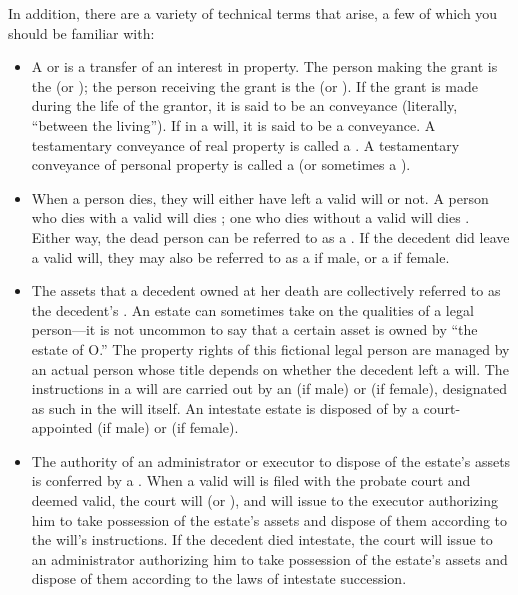 In addition, there are a variety of technical terms that arise, a few of which
you should be familiar with:
\begin{itemize}
\item A  or  is a transfer of an interest in
property. The person making the grant is the  (or
); the person receiving the grant is the  (or
). If the grant is made during the life of the grantor,
it is said to be an  conveyance (literally, ``between the
living''). If in a will, it is said to be a  conveyance. A
testamentary conveyance of real property is called a . A
testamentary conveyance of personal property is called a  (or
sometimes a ).

\item When a person dies, they will either have left a valid will or not. A
person who dies with a valid will dies ; one who dies without a
valid will dies . Either way, the dead person can be
referred to as a . If the decedent did leave a valid will,
they may also be referred to as a  if male, or a
 if female. 

\item The assets that a decedent owned at her death are collectively referred to
as the decedent's . An estate can sometimes take on the
qualities of a legal person---it is not uncommon to say that a certain asset is
owned by ``the estate of O.'' The property rights of this fictional legal
person are managed by an actual person whose title depends on whether the
decedent left a will. The instructions in a will are carried out by an
 (if male) or  (if female), designated as
such in the will itself. An intestate estate is disposed of by a
court-appointed  (if male) or  (if
female). 

\item The authority of an administrator or executor to dispose of the estate's
assets is conferred by a . When a valid will is filed
with the probate court and deemed valid, the court will  (or ), and will issue  to the executor authorizing him to take possession of the
estate's assets and dispose of them according to the will's instructions. If
the decedent died intestate, the court will issue  to an administrator authorizing him to take possession of the
estate's assets and dispose of them according to the laws of intestate
succession.


\end{itemize}
